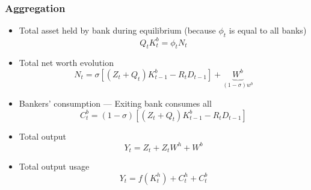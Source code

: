 \begin{frame}
    \frametitle{Aggregation}

    \begin{itemize}
        \item Total asset held by bank during equilibrium (because $\phi_t$ is equal to all banks)
        \begin{equation}
            Q_t K^b_t = \phi_t N_t 
        \end{equation}
        \item Total net worth evolution
        \begin{equation}
            N_t = \sigma \left[(Z_t+Q_t)K^b_{t-1} - R_t D_{t-1}\right] + \underbrace{W^b}_{(1-\sigma)w^b}
        \end{equation}

        \item Bankers' consumption --- Exiting bank consumes all 
        \begin{equation}
            C^b_t = (1-\sigma) \left[(Z_t+Q_t)K^b_{t-1} - R_t D_{t-1}\right]
        \end{equation}

        \item Total output 
        \begin{equation}
            Y_t = Z_t + Z_t W^h + W^b 
        \end{equation}
        \item Total output usage 
        \begin{equation}
            Y_t = f(K^h_t) + C^h_t + C^b_t
        \end{equation}
    \end{itemize}
\end{frame}